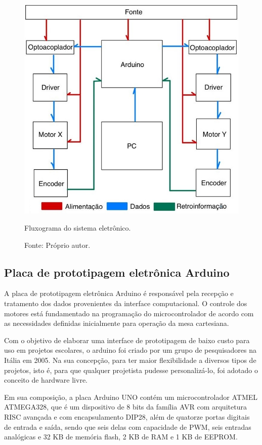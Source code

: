 \begin{figure}[H]
\centering
\includegraphics[scale = 0.6]{figuras/fluxogramaeletronico}
\caption{Fluxograma do sistema eletrônico.}
\caption*{Fonte: Próprio autor.}
\label{fig:fluxogramaeletronico}
\end{figure}
    
\subsection{Placa de prototipagem eletrônica Arduino}\label{subsec:metarduino}

A placa de prototipagem eletrônica Arduino é responsável pela recepção e tratamento dos dados provenientes 
da interface computacional. O controle dos motores está fundamentado na programação do microcontrolador 
de acordo com as necessidades definidas inicialmente para operação da mesa cartesiana.

Com o objetivo de elaborar uma interface de prototipagem de baixo custo para uso em projetos escolares, 
o arduino foi criado por um grupo de pesquisadores na Itália em 2005. Na sua concepção, para ter maior 
flexibilidade a diversos tipos de projetos, isto é, para que qualquer projetista pudesse personalizá-lo, 
foi adotado o conceito de hardware livre.

Em sua composição, a placa Arduino UNO contém um microcontrolador ATMEL ATMEGA328, que é um dispositivo 
de 8 bits da família AVR com arquitetura \ac{RISC} avançada e com encapsulamento DIP28, além de quatorze portas 
digitais de entrada e saída, sendo que seis delas com capacidade de \ac{PWM}, seis 
entradas analógicas e 32 KB de memória flash, 2 KB de \ac{RAM} e 1 KB de \ac{EEPROM}. 

